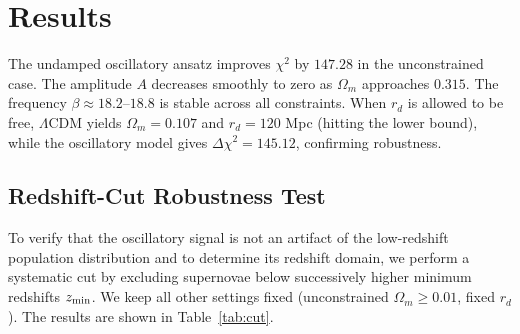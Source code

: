 \documentclass[10pt,a4paper,twocolumn]{article}
\begin{document}
\section{Results}
\begin{table}[!htbp]
\centering
\caption{Reduced table 1 ( tightened for column width )}
\setlength{\tabcolsep}{3pt} %
\label{tab:1}
\end{table}

The undamped oscillatory ansatz improves $\chi^2$ by $147.28$ in the unconstrained case. The amplitude $A$ decreases smoothly to zero as $\Omega_m$ approaches $0.315$. The frequency $\beta\approx18.2$–$18.8$ is stable across all constraints. When $r_d$ is allowed to be free, $\Lambda$CDM yields $\Omega_m=0.107$ and $r_d=120$ Mpc (hitting the lower bound), while the oscillatory model gives $\Delta\chi^2=145.12$, confirming robustness.

\subsection{Redshift-Cut Robustness Test}
To verify that the oscillatory signal is not an artifact of the low-redshift population distribution and to determine its redshift domain, we perform a systematic cut by excluding supernovae below successively higher minimum redshifts $z_{\rm min}$. We keep all other settings fixed (unconstrained $\Omega_m\ge0.01$, fixed $r_d$). The results are shown in Table~\ref{tab:cut}.
\end{document}
